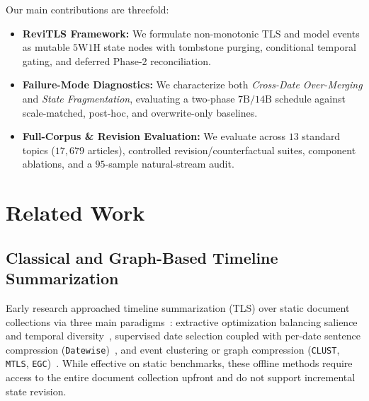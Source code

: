 \documentclass[journal]{IEEEtran}
\begin{document}
Our main contributions are threefold:
\begin{itemize}
    \item \textbf{ReviTLS Framework:} We formulate non-monotonic TLS and model events as mutable $5\text{W}1\text{H}$ state nodes with tombstone purging, conditional temporal gating, and deferred Phase-2 reconciliation.
    \item \textbf{Failure-Mode Diagnostics:} We characterize both \textit{Cross-Date Over-Merging} and \textit{State Fragmentation}, evaluating a two-phase $7\text{B}/14\text{B}$ schedule against scale-matched, post-hoc, and overwrite-only baselines.
    \item \textbf{Full-Corpus \& Revision Evaluation:} We evaluate across $13$ standard topics ($17{,}679$ articles), controlled revision/counterfactual suites, component ablations, and a $95$-sample natural-stream audit.
\end{itemize}

\section{Related Work}
\label{sec:related}

\subsection{Classical and Graph-Based Timeline Summarization}
Early research approached timeline summarization (TLS) over static document collections via three main paradigms~\cite{tran2013leveraging, tran2015timeline, martschat2017improving, ghalandari2020examining}: extractive optimization balancing salience and temporal diversity~\cite{martschat2018temporally}, supervised date selection coupled with per-date sentence compression (\texttt{Datewise})~\cite{ghalandari2020examining, steen2019abstractive}, and event clustering or graph compression (\texttt{CLUST}, \texttt{MTLS}, \texttt{EGC})~\cite{ghalandari2020examining, yu2021multi, li2021timeline}. While effective on static benchmarks, these offline methods require access to the entire document collection upfront and do not support incremental state revision.
\end{document}
